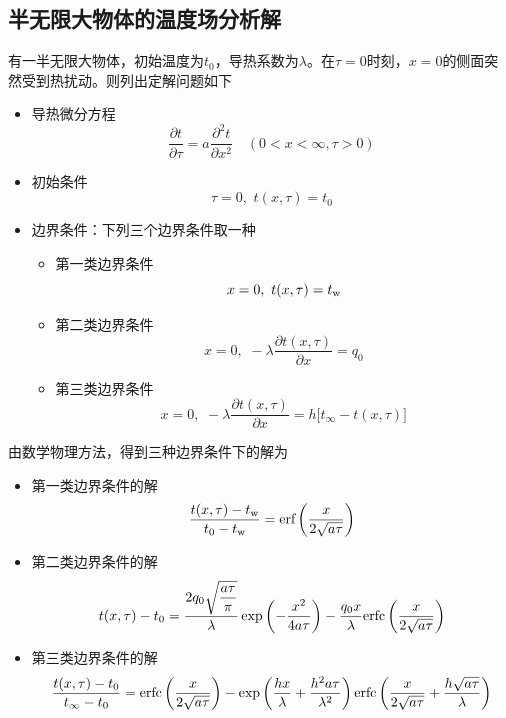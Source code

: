 \subsection{半无限大物体的温度场分析解}
有一半无限大物体，初始温度为$t_0$，导热系数为$\lambda$。在$\tau = 0$时刻，$x = 0$的侧面突然受到热扰动。则列出定解问题如下
\begin{itemize}
	\item 导热微分方程
	\begin{equation}
		\dfrac{\partial t}{\partial \tau} = a \dfrac{\partial^2 t}{\partial x^2}\quad (0<x<\infty,\tau > 0)
	\end{equation}
	
	\item 初始条件
	\begin{equation}
		\tau = 0,\,\, t(x, \tau) = t_0
	\end{equation}

	\item 边界条件：下列三个边界条件取一种
	\begin{itemize}
		\item 第一类边界条件
		\begin{equation}
			x = 0, \,\, t(x, \tau) = t_{\text{w}}
		\end{equation}
		\item 第二类边界条件
		\begin{equation}
			x = 0, \, \, - \lambda \dfrac{\partial t(x, \tau)}{\partial x} = q_0
		\end{equation}
		\item 第三类边界条件
		\begin{equation}
			x = 0, \, \, - \lambda \dfrac{\partial t(x, \tau)}{\partial x} = h \big[t_\infty - t(x, \tau)\big]
		\end{equation}
	\end{itemize}
	
\end{itemize}

\noindent 由数学物理方法，得到三种边界条件下的解为
\begin{itemize}
	\item 第一类边界条件的解
	\begin{equation}
		\dfrac{t(x, \tau)-t_{\text{w}}}{t_0 - t_{\text{w}}} = \text{erf} \left(\dfrac{x}{2\sqrt{a\tau}}\right)
	\end{equation}
	\item 第二类边界条件的解
	\begin{equation}
		t(x, \tau)  - t_0 = \dfrac{2 q_0 \sqrt{\dfrac{a \tau}{\pi}}}{\lambda} \exp \left(-\dfrac{x^2}{4 a \tau}\right) - \dfrac{q_0 x}{\lambda} \text{erfc} \left(\dfrac{x}{2\sqrt{a \tau}}\right)
	\end{equation}
	\item 第三类边界条件的解
	\begin{equation}
		\dfrac{t(x, \tau) - t_0}{t_\infty - t_0} = \text{erfc}\left(\dfrac{x}{2\sqrt{a \tau}}\right) - \exp\left(\dfrac{hx}{\lambda} + \dfrac{h^2 a \tau}{\lambda^2}\right)\text{erfc} \left(\dfrac{x}{2\sqrt{a\tau}} + \dfrac{h\sqrt{a \tau}}{\lambda}\right)
	\end{equation}
\end{itemize}

